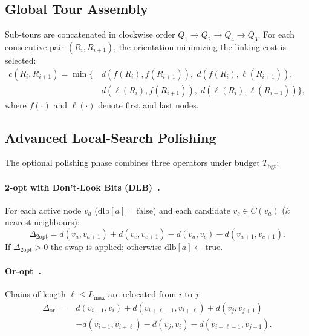 \documentclass[runningheads]{llncs}
\begin{document}
\subsection{Global Tour Assembly}

Sub-tours are concatenated in clockwise order
$Q_1\!\to\!Q_2\!\to\!Q_4\!\to\!Q_3$. For each consecutive pair
$(R_i,R_{i+1})$, the orientation minimizing the linking cost is
selected:
\begin{equation}
\begin{split}
c(R_i,R_{i+1})=\min\bigl\{
  &\,d(f(R_i),f(R_{i+1})),\;d(f(R_i),\ell(R_{i+1})),\\
  &\,d(\ell(R_i),f(R_{i+1})),\;d(\ell(R_i),\ell(R_{i+1}))\bigr\},
\end{split}
\end{equation}
where $f(\cdot)$ and $\ell(\cdot)$ denote first and last nodes.

\subsection{Advanced Local-Search Polishing}

The optional polishing phase combines three operators under budget
$T_{\text{bgt}}$:

\paragraph{2-opt with Don't-Look Bits (DLB)~\cite{bentley1992fast}.}
For each active node $v_a$ ($\text{dlb}[a]=\mathrm{false}$) and
each candidate $v_c\in C(v_a)$ ($k$ nearest neighbours):
\begin{equation}
\Delta_{2\text{opt}}=
  d(v_a,v_{a+1})+d(v_c,v_{c+1})
 -d(v_a,v_c)-d(v_{a+1},v_{c+1}).
\end{equation}
If $\Delta_{2\text{opt}}>0$ the swap is applied; otherwise
$\text{dlb}[a]\gets\mathrm{true}$.

\paragraph{Or-opt~\cite{or1976traveling}.}
Chains of length $\ell\le L_{\max}$ are relocated from $i$ to $j$:
\begin{equation}
\begin{split}
\Delta_{\text{or}}=\;
  &d(v_{i-1},v_i)+d(v_{i+\ell-1},v_{i+\ell})+d(v_j,v_{j+1})\\
  &-d(v_{i-1},v_{i+\ell})-d(v_j,v_i)-d(v_{i+\ell-1},v_{j+1}).
\end{split}
\end{equation}
\end{document}
